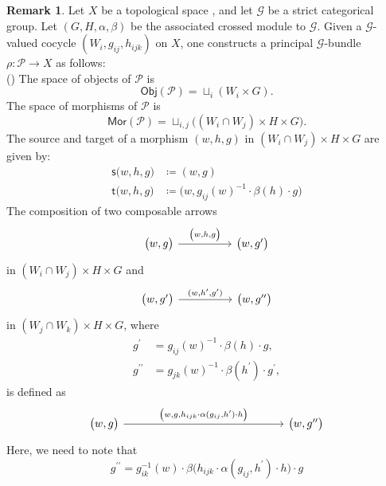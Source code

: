 \documentclass{article}
\theoremstyle{plain}
\theoremstyle{definition}
\newtheorem{rem}[thm]{Remark}
\newcommand{\rNum}[1]{\lowercase\expandafter{\romannumeral #1\relax}}
\begin{document}
\begin{rem}\cite{MR2342821}\cite[Remark 2.16 on page 583]{MR2805195}\label{objandmorcatbun}
Let $X$ be a topological space , and let $\mathcal{G}$ be a strict categorical group. Let $(G,H,\alpha,\beta)$ be the associated crossed module to $\mathcal{G}$. Given a $\mathcal{G}$-valued cocycle $(W_i,g_{ij},h_{ijk})$ on $X$, one constructs a principal $\mathcal{G}$-bundle $\rho:\mathcal{P} \longrightarrow X$ as follows: \\
(\rNum{1}) The space of objects of $\mathcal{P}$ is
\begin{equation}\label{objs}
\mathsf{Obj}(\mathcal{P}) = \sqcup_i (W_i \times G).
\end{equation}
The space of morphisms of $\mathcal{P}$ is
\begin{equation}\label{mors}
\mathsf{Mor}(\mathcal{P}) = \sqcup_{i,j} \bigl((W_i \cap W_j) \times H \times G\bigr).
\end{equation}
The source and target of a morphism $(w,h,g)$ in $(W_i \cap W_j) \times H \times G$ are given by:
\begin{align}
\mathsf{s}\bigl(w,h,g\bigr) & \coloneq (w,g) \\
\mathsf{t}\bigl(w,h,g\bigr) & \coloneq \bigl(w,g_{ij}(w)^{-1} \cdot \beta(h) \cdot g\bigr)
\end{align}
The composition of two composable arrows
\[
\begin{tikzcd}
\bigl(w,g\bigr) \arrow[rr,"{\bigl(w,h,g\bigr)}"] & & \bigl(w,g^\prime\bigr)
\end{tikzcd}
\]
in $(W_i \cap W_j) \times H \times G$ and
\[
\begin{tikzcd}
\bigl(w,g^\prime\bigr) \arrow[rr,"{(w,h^\prime,g^\prime)}"] & & \bigl(w,g^{\prime\prime}\bigr)
\end{tikzcd}
\]
in $(W_j \cap W_k) \times H \times G$, where
\begin{align*}
g^\prime & = g_{ij}(w)^{-1} \cdot \beta(h) \cdot g, \\
g^{\prime\prime} & = g_{jk}(w)^{-1} \cdot \beta(h^\prime) \cdot g^\prime,
\end{align*}
is defined as
\[
\begin{tikzcd}[row sep=huge,column sep=huge]
\bigl(w,g\bigr) \arrow[rrr,"{\bigl(w,g,h_{ijk} \cdot \alpha(g_{ij},h^\prime) \cdot h\bigr)}"] & & & \bigl(w,g^{\prime\prime}\bigr)
\end{tikzcd}
\]
Here, we need to note that
\[
g^{\prime\prime} = g_{ik}^{-1}(w) \cdot \beta\bigl(h_{ijk} \cdot \alpha(g_{ij},h^\prime) \cdot h\bigr) \cdot g
\]
\end{rem}
\end{document}
